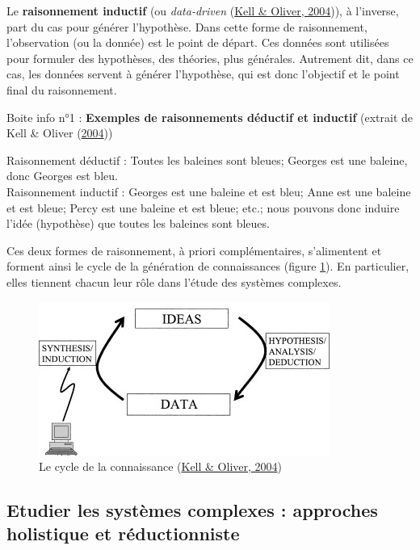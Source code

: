 \documentclass[12pt,twoside]{reedthesis}
\begin{document}
Le \textbf{raisonnement inductif} (ou \emph{data-driven} (\protect\hyperlink{ref-kell_here_2004}{Kell \& Oliver, 2004})), à l'inverse, part du cas pour générer l'hypothèse. Dans cette forme de raisonnement, l'observation (ou la donnée) est le point de départ. Ces données sont utilisées pour formuler des hypothèses, des théories, plus générales. Autrement dit, dans ce cas, les données servent à générer l'hypothèse, qui est donc l'objectif et le point final du raisonnement.\\
\begin{lightcyanbox}
\begin{center}
Boite info n°1 : \textbf{Exemples de raisonnements déductif et inductif} (extrait de Kell \& Oliver (\protect\hyperlink{ref-kell_here_2004}{2004}))

\end{center}
Raisonnement déductif : Toutes les baleines sont bleues; Georges est une baleine, donc Georges est bleu.\\

Raisonnement inductif : Georges est une baleine et est bleu; Anne est une baleine et est bleue; Percy est une baleine et est bleue; etc.; nous pouvons donc induire l'idée (hypothèse) que toutes les baleines sont bleues.

\end{lightcyanbox}
Ces deux formes de raisonnement, à priori complémentaires, s'alimentent et forment ainsi le cycle de la génération de connaissances (figure \ref{fig:cycle-knowledge}). En particulier, elles tiennent chacun leur rôle dans l'étude des systèmes complexes.\\
\begin{figure}

{\centering \includegraphics[width=0.6\linewidth]{figure/cycle_knowledge} 

}

\caption[Le cycle de la connaissance]{Le cycle de la connaissance (\protect\hyperlink{ref-kell_here_2004}{Kell \& Oliver, 2004})}\label{fig:cycle-knowledge}
\end{figure}
\hypertarget{study-complex-systems}{%
\subsection{Etudier les systèmes complexes : approches holistique et réductionniste}\label{study-complex-systems}}
\end{document}
